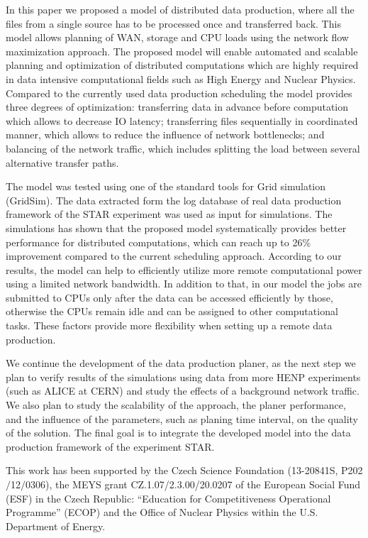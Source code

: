 \documentclass{svjour3}                     %
\begin{document}
In this paper we proposed a model of distributed data production, where all
the files from a single source has to be processed once and transferred back.
This model allows planning of WAN, storage and CPU loads using the network
flow maximization approach. The proposed model will enable automated and scalable planning and optimization of distributed computations which are highly required in data intensive computational fields such as High Energy and Nuclear Physics. Compared to the currently used data production scheduling the model provides three degrees of optimization: transferring data in advance before computation which allows to decrease IO latency; transferring  files sequentially in coordinated manner, which allows to reduce the influence of network bottlenecks; and balancing of the network traffic, which includes splitting the load between several alternative transfer paths.

The model was tested using one of the standard tools for Grid simulation (GridSim). The data extracted form the log database of real data production framework of the STAR experiment was used as input for simulations. The simulations has shown that the proposed model systematically provides better performance for distributed computations, which can reach up to 26\% improvement compared to the current scheduling approach. According to our results, the model can help to efficiently utilize more remote computational power using a limited network bandwidth. In addition to that, in our model the jobs are submitted to CPUs only after the data can be accessed efficiently by those, otherwise the CPUs remain idle and can be assigned to other computational tasks. These factors provide more flexibility when setting up a remote data production.

We continue the development of the data production planer, as the next step we plan to verify results of the simulations using data from more HENP experiments (such as ALICE at CERN) and study the effects of a background network traffic. We also plan to study the scalability of the approach, the planer performance, and the influence of the parameters, such as planing time interval, on the quality of the solution. The final goal is to integrate the developed model into the data production framework of the experiment STAR.


\begin{acknowledgements}
This work has been supported by the Czech Science Foundation
(13-20841S, P202$/$12$/$0306),  the MEYS grant CZ.1.07/2.3.00/20.0207 of the European Social Fund (ESF) in the Czech Republic: “Education for Competitiveness Operational Programme” (ECOP) and the Office of Nuclear Physics within the U.S. Department of Energy.  
\end{acknowledgements}

{}

\end{document}
